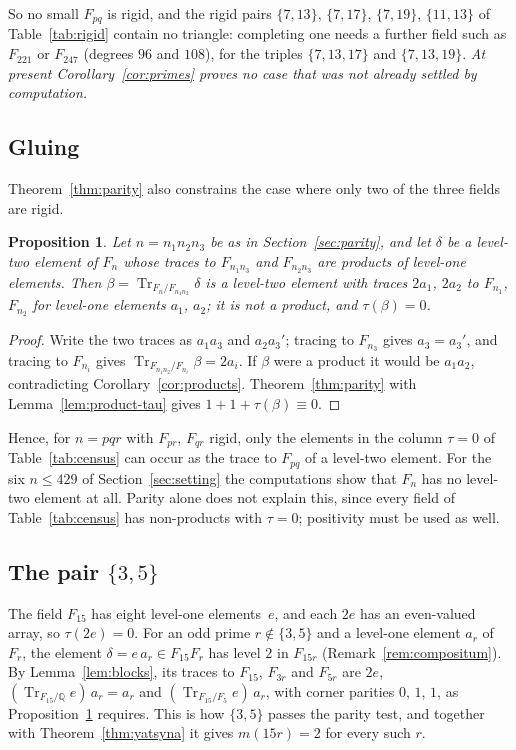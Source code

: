\documentclass[11pt]{amsart}
\newcommand{\Q}{\mathbb{Q}}
\DeclareMathOperator{\Tr}{Tr}
\theoremstyle{plain}
\newtheorem{proposition}[theorem]{Proposition}
\theoremstyle{definition}
\begin{document}
So no small $F_{pq}$ is rigid, and the rigid pairs $\{7,13\}$, $\{7,17\}$, $\{7,19\}$,
$\{11,13\}$ of Table~\ref{tab:rigid} contain no triangle: completing one needs a further field
such as $F_{221}$ or $F_{247}$ (degrees $96$ and $108$), for the triples $\{7,13,17\}$ and
$\{7,13,19\}$. \emph{At present
Corollary~\ref{cor:primes} proves no case that was not already settled by computation.}

\subsection{Gluing}\label{sec:gluing}
Theorem~\ref{thm:parity} also constrains the case where only two of the three fields are rigid.

\begin{proposition}\label{prop:glue}
Let $n = n_1n_2n_3$ be as in Section~\ref{sec:parity}, and let $\delta$ be a level-two element of
$F_n$ whose traces to $F_{n_1n_3}$ and $F_{n_2n_3}$ are products of level-one elements. Then
$\beta = \Tr_{F_n/F_{n_1n_2}}\delta$ is a level-two element with traces $2a_1$, $2a_2$ to
$F_{n_1}$, $F_{n_2}$ for level-one elements $a_1$, $a_2$; it is not a product, and $\tau(\beta) = 0$.
\end{proposition}

\begin{proof}
Write the two traces as $a_1a_3$ and $a_2a_3'$; tracing to $F_{n_3}$ gives $a_3 = a_3'$, and
tracing to $F_{n_i}$ gives $\Tr_{F_{n_1n_2}/F_{n_i}}\beta = 2a_i$. If $\beta$ were a product it
would be $a_1a_2$, contradicting Corollary~\ref{cor:products}. Theorem~\ref{thm:parity} with
Lemma~\ref{lem:product-tau} gives $1 + 1 + \tau(\beta) \equiv 0$.
\end{proof}

Hence, for $n = pqr$ with $F_{pr}$, $F_{qr}$ rigid, only the elements in the column
$\tau = 0$ of Table~\ref{tab:census} can occur as the trace to $F_{pq}$ of a level-two element.
For the six $n \leq 429$ of Section~\ref{sec:setting} the computations show that $F_n$ has no
level-two element at all. Parity alone does not explain this, since every field of
Table~\ref{tab:census} has non-products with $\tau = 0$; positivity must be used as well.

\subsection{The pair \texorpdfstring{$\{3,5\}$}{\{3,5\}}}\label{sec:three-five}
The field $F_{15}$ has eight level-one elements~$e$, and each $2e$ has an even-valued array, so
$\tau(2e) = 0$. For an odd prime $r \notin \{3,5\}$ and a level-one element $a_r$ of $F_r$, the
element $\delta = e\,a_r \in F_{15}F_r$ has level $2$ in $F_{15r}$ (Remark~\ref{rem:compositum}).
By Lemma~\ref{lem:blocks}, its traces to $F_{15}$, $F_{3r}$ and $F_{5r}$ are $2e$,
$(\Tr_{F_{15}/\Q}e)\,a_r = a_r$ and $(\Tr_{F_{15}/F_5}e)\,a_r$, with corner parities $0$, $1$,
$1$, as Proposition~\ref{prop:glue} requires. This is how $\{3,5\}$ passes the parity test, and
together with Theorem~\ref{thm:yatsyna} it gives $m(15r) = 2$ for every such $r$.
\end{document}
